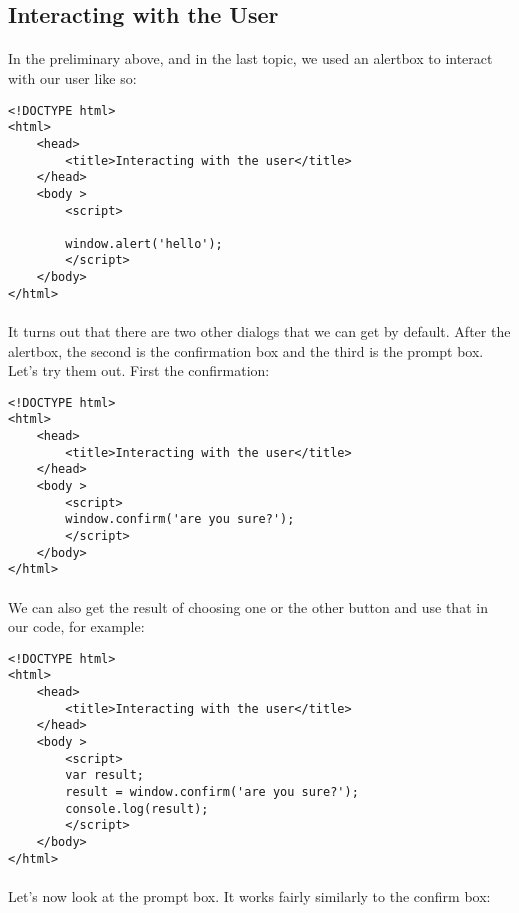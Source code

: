 \documentclass[10pt, a4paper, twosize]{article}
\begin{document}
\subsection{Interacting with the User}

\paragraph{} In the preliminary above, and in the last topic, we used an alertbox to interact with our user like so:

\begin{lstlisting}
<!DOCTYPE html>
<html>
    <head>
        <title>Interacting with the user</title>
    </head>
    <body >
        <script>
            
        window.alert('hello');    
        </script>
    </body>
</html>
\end{lstlisting}



\paragraph{} It turns out that there are two other dialogs that we can get by default. After the alertbox, the second is the confirmation box and the third is the prompt box. Let's try them out. First the confirmation:


\begin{lstlisting}
<!DOCTYPE html>
<html>
    <head>
        <title>Interacting with the user</title>
    </head>
    <body >
        <script>
        window.confirm('are you sure?');   
        </script>
    </body>
</html>
\end{lstlisting}

\paragraph{} We can also get the result of choosing one or the other button and use that in our code, for example:

\begin{lstlisting}
<!DOCTYPE html>
<html>
    <head>
        <title>Interacting with the user</title>
    </head>
    <body >
        <script>
        var result;
        result = window.confirm('are you sure?');
        console.log(result);    
        </script>
    </body>
</html>
\end{lstlisting}

\paragraph{} Let's now look at the prompt box. It works fairly similarly to the confirm box:
\end{document}
